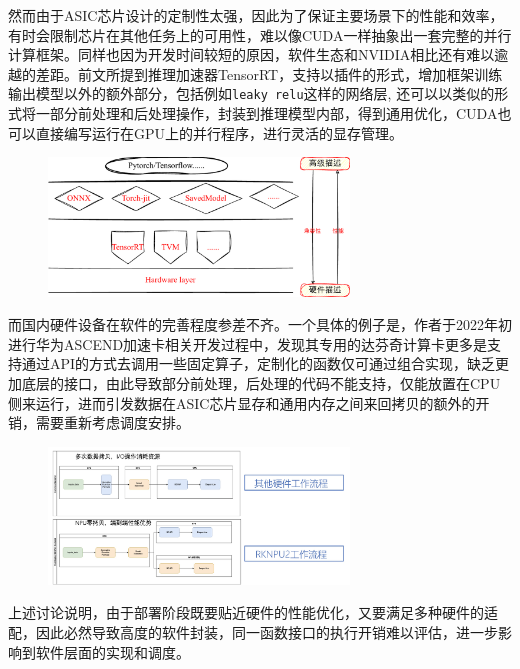 \documentclass[master]{shtthesis}
\begin{document}
然而由于ASIC芯片设计的定制性太强，因此为了保证主要场景下的性能和效率，有时会限制芯片在其他任务上的可用性，难以像CUDA一样抽象出一套完整的并行计算框架。同样也因为开发时间较短的原因，软件生态和NVIDIA相比还有难以逾越的差距。前文所提到推理加速器TensorRT，支持以插件的形式，增加框架训练输出模型以外的额外部分，包括例如\verb|leaky relu|\cite{xu2015empirical}这样的网络层, 还可以以类似的形式将一部分前处理和后处理操作，封装到推理模型内部，得到通用优化，CUDA也可以直接编写运行在GPU上的并行程序，进行灵活的显存管理。

\begin{figure}[htbp]
	\centering
	\includegraphics[width=8cm]{img/4.pdf}
	\label{视觉算法模型的兼容性和性能权衡}
\end{figure}

而国内硬件设备在软件的完善程度参差不齐。一个具体的例子是，作者于2022年初进行华为ASCEND加速卡相关开发过程中，发现其专用的达芬奇计算卡更多是支持通过API的方式去调用一些固定算子，定制化的函数仅可通过组合实现，缺乏更加底层的接口，由此导致部分前处理，后处理的代码不能支持，仅能放置在CPU侧来运行，进而引发数据在ASIC芯片显存和通用内存之间来回拷贝的额外的开销，需要重新考虑调度安排。
\begin{figure}[htbp]
	\centering
	\includegraphics[width=8cm]{img/rknn_support.jpeg}
	\label{rknn-support}
\end{figure}

上述讨论说明，由于部署阶段既要贴近硬件的性能优化，又要满足多种硬件的适配，因此必然导致高度的软件封装，同一函数接口的执行开销难以评估，进一步影响到软件层面的实现和调度。
\end{document}
